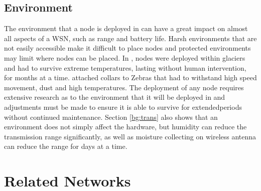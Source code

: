 \subsection{Environment}
	The environment that a node is deployed in can have a great impact on almost all aspects of a WSN, such as range and battery life. Harsh environments that are not easily accessible make it difficult to place nodes and protected environments may limit where nodes can be placed. 
	In \cite{Martinez2004}, nodes were deployed within glaciers and had to survive extreme temperatures, lasting without human intervention, for months at a time. \cite{Juang2002} attached collars to Zebras that had to withstand high speed movement, dust and high temperatures. The deployment of any node requires extensive research as to the environment that it will be deployed in and adjustments must be made to ensure it is able to survive for extendedperiods without continued maintenance.
	Section \ref{bg:trans} also shows that an environment does not simply affect the hardware, but humidity can reduce the transmission range significantly, as well as moisture collecting on wireless antenna can reduce the range for days at a time.


\section{Related Networks}
	





